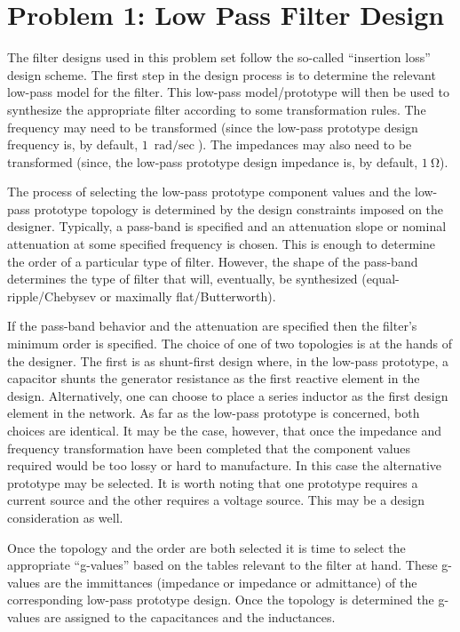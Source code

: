 \section*{Problem 1: Low Pass Filter Design}

The filter designs used in this problem set follow the so-called ``insertion
loss'' design scheme. The first step in the design process is to determine the
relevant low-pass model for the filter. This low-pass model/prototype will then be used to
synthesize the appropriate filter according to some transformation rules. The
frequency may need to be transformed (since the low-pass prototype design
frequency is, by default, $\SI{1}{\radian\per\sec} $). The impedances may also
need to be transformed (since, the low-pass prototype design impedance is, by
default, $\SI{1}{\ohm}$).  

The process of selecting the low-pass prototype component values and the
low-pass prototype topology is determined by the design constraints imposed on
the designer. Typically, a pass-band is specified and an attenuation slope or
nominal attenuation at some specified frequency is chosen. This is enough to
determine the order of a particular type of filter. However, the shape of the
pass-band determines the type of filter that will, eventually, be synthesized
(equal-ripple/Chebysev or maximally flat/Butterworth). 

If the pass-band behavior and the attenuation are specified then the filter's
minimum order is specified. The choice of one of two topologies is at the hands
of the designer. The first is as shunt-first design where, in the low-pass
prototype, a capacitor shunts the generator resistance as the first reactive
element in the design. Alternatively, one can choose to place a series inductor
as the first design element in the network. As far as the low-pass prototype is
concerned, both choices are identical. It may be the case, however, that once
the impedance and frequency transformation have been completed that the
component values required would be too lossy or hard to manufacture. In this
case the alternative prototype may be selected. It is worth noting that one
prototype requires a current source and the other requires a voltage source.
This may be a design consideration as well.

Once the topology and the order are both selected it is time to select the
appropriate ``g-values'' based on the tables relevant to the filter at hand.
These g-values are the immittances (impedance or impedance or admittance) of the
corresponding low-pass prototype design. Once the topology is determined the
g-values are assigned to the capacitances and the inductances. 

